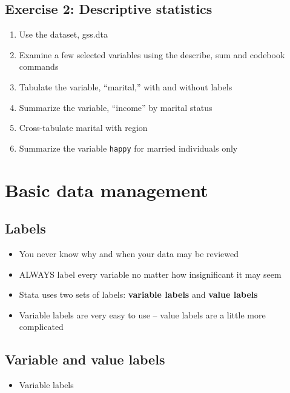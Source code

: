 \documentclass[]{book}
\providecommand{\tightlist}{%
  \setlength{\itemsep}{0pt}\setlength{\parskip}{0pt}}
\begin{document}
\subsection{Exercise 2: Descriptive
statistics}\label{exercise-2-descriptive-statistics}

\begin{enumerate}
\def\labelenumi{\arabic{enumi}.}
\tightlist
\item
  Use the dataset, gss.dta
\item
  Examine a few selected variables using the describe, sum and codebook
  commands
\item
  Tabulate the variable, ``marital,'' with and without labels
\item
  Summarize the variable, ``income'' by marital status
\item
  Cross-tabulate marital with region
\item
  Summarize the variable \texttt{happy} for married individuals only
\end{enumerate}

\section{Basic data management}\label{basic-data-management}

\subsection{Labels}\label{labels}

\begin{itemize}
\tightlist
\item
  You never know why and when your data may be reviewed
\item
  ALWAYS label every variable no matter how insignificant it may seem
\item
  Stata uses two sets of labels: \textbf{variable labels} and
  \textbf{value labels}
\item
  Variable labels are very easy to use -- value labels are a little more
  complicated
\end{itemize}

\subsection{Variable and value labels}\label{variable-and-value-labels}

\begin{itemize}
\tightlist
\item
  Variable labels
\end{itemize}
\end{document}
